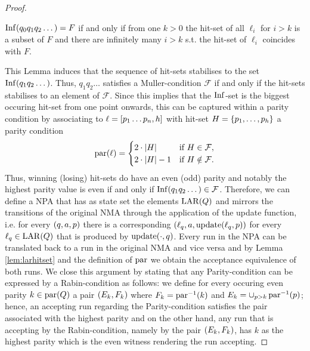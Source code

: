 \begin{proof}
  \begin{lemma}
    \cite[Lemma 1.21]{AutoLogInfGames}
    $\operatorname{Inf}(q_{0}q_{1}q_{2}\dots) = F$ if and only if from one $k>0$ the hit-set 
    of all $\ell_{i}$ for $i>k$ is a subset of $F$ and there are infinitely 
    many $i>k$ s.t. the hit-set of $\ell_{i}$ coincides with $F$.
    \label{lem:larhitset}
  \end{lemma}
  This Lemma induces that the sequence of hit-sets stabilises to the set
  $\operatorname{Inf}(q_{1}q_{2}\dots)$. Thus, $q_{1}q_{2}\dots$ satisfies a Muller-condition
  $\mathcal{F}$ if and only if the hit-sets stabilises to an element of
  $\mathcal{F}$. Since this implies that the $\operatorname{Inf}$-set is the biggest occuring 
  hit-set from one point onwards, this can be captured within a parity
  condition by associating to $\ell = \left[p_{1}\dots p_{n},h\right]$ with
  hit-set $H = \left\{p_{1},\dots,p_{h}\right\}$ a parity condition
  \begin{equation*}
    \operatorname{par}(\ell) = \begin{cases}
      2\cdot\left\vert{H}\right\vert &\text{if }H\in\mathcal{F},\\
      2\cdot\left\vert{H}\right\vert-1 &\text{if }H\notin\mathcal{F}.
    \end{cases}
  \end{equation*}
  Thus, winning (losing) hit-sets do have an even (odd) parity and notably the
  highest parity value is even if and only if
  $\operatorname{Inf}(q_{1}q_{2}\dots)\in\mathcal{F}$. Therefore, we can define a \ac{NPA}
  that has as state set the elements $\operatorname{LAR}(Q)$ and mirrors the transitions of
  the original \ac{NMA} through the application of the update function, i.e.
  for every $\left(q, a, p\right)$ there is a corresponding
  $\left(\ell_{q}, a, \operatorname{update}(\ell_{q}, p)\right)$ for every $\ell_{q}\in\operatorname{LAR}(Q)$ that
  is produced by $\operatorname{update}(\cdot,q)$. Every run in the \ac{NPA} can be translated
  back to a run in the original \ac{NMA} and vice versa and by Lemma
  \ref{lem:larhitset} and the definition of $\operatorname{par}$ we obtain the acceptance
  equivalence of both runs. We close this argument by stating that
  any Parity-condition can be expressed by a Rabin-condition as follows:
  we define for every occuring even parity $k\in\operatorname{par}(Q)$ a pair
  $\left(E_{k}, F_{k}\right)$ where $F_{k} = \operatorname{par}^{-1}(k)$ and
  $E_{k} = \cup_{p>k}\operatorname{par}^{-1}(p)$; hence, an accepting run regarding the
  Parity-condition satisfies the pair associated with the highest parity and
  on the other hand, any run that is accepting by the Rabin-condition, namely
  by the pair $\left(E_{k}, F_{k}\right)$, has  $k$ as the highest parity which is
  the even witness rendering the run accepting.


\end{proof}
